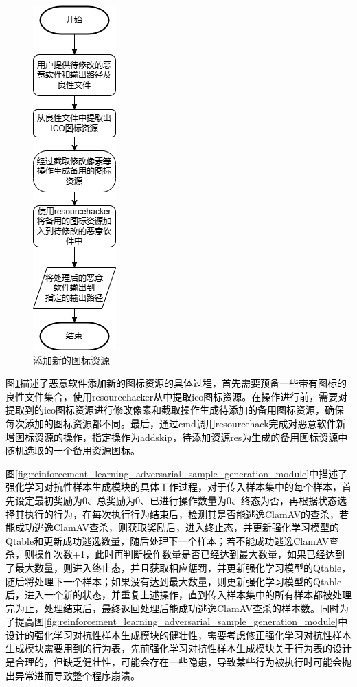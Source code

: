\begin{figure}[htbp]
  \centering
  \includegraphics[]{images/add_resources.png}
  \caption{添加新的图标资源}\label{fig:add_resources}
\end{figure}

\textcolor{black}{图\ref{fig:add_resources}描述了恶意软件添加新的图标资源的具体过程，首先需要预备一些带有图标的良性文件集合，使用resourcehacker从中提取ico图标资源。在操作进行前，需要对提取到的ico图标资源进行修改像素和截取操作生成待添加的备用图标资源，确保每次添加的图标资源都不同。最后，通过cmd调用resourcehack完成对恶意软件新增图标资源的操作，指定操作为addskip，待添加资源res为生成的备用图标资源中随机选取的一个备用资源图标。}

\textcolor{black}{图\ref{fig:reinforcement_learning_adversarial_sample_generation_module}中描述了强化学习对抗性样本生成模块的具体工作过程，对于传入样本集中的每个样本，首先设定最初奖励为0、总奖励为0、已进行操作数量为0、终态为否，再根据状态选择其执行的行为，在每次执行行为结束后，检测其是否能逃逸ClamAV的查杀，若能成功逃逸ClamAV查杀，则获取奖励后，进入终止态，并更新强化学习模型的Qtable和更新成功逃逸数量，随后处理下一个样本；若不能成功逃逸ClamAV查杀，则操作次数+1，此时再判断操作数量是否已经达到最大数量，如果已经达到了最大数量，则进入终止态，并且获取相应惩罚，并更新强化学习模型的Qtable，随后将处理下一个样本；如果没有达到最大数量，则更新强化学习模型的Qtable后，进入一个新的状态，并重复上述操作，直到传入样本集中的所有样本都被处理完为止，处理结束后，最终返回处理后能成功逃逸ClamAV查杀的样本数。同时为了提高图\ref{fig:reinforcement_learning_adversarial_sample_generation_module}中设计的强化学习对抗性样本生成模块的健壮性，需要考虑修正强化学习对抗性样本生成模块需要用到的行为表，先前强化学习对抗性样本生成模块关于行为表的设计是合理的，但缺乏健壮性，可能会存在一些隐患，导致某些行为被执行时可能会抛出异常进而导致整个程序崩溃。}

